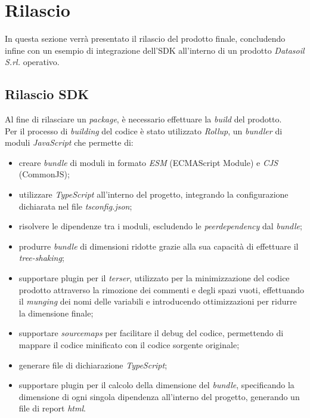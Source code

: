 \chapter{Rilascio}
\label{chap:rilascio}
In questa sezione verrà presentato il rilascio del prodotto finale, concludendo infine con un esempio di integrazione dell'SDK
all'interno di un prodotto \textit{Datasoil S.rl.} operativo.

\section{Rilascio SDK}
Al fine di rilasciare un \textit{package}, è necessario effettuare la \textit{build} del prodotto. \\
Per il processo di \textit{building} del codice è stato utilizzato \textit{Rollup}, un \textit{bundler} di moduli \textit{JavaScript} che permette di:
\begin{itemize}
    \item creare \textit{bundle} di moduli in formato \textit{ESM} (ECMAScript Module) e \textit{CJS} (CommonJS);
    \item utilizzare \textit{TypeScript} all'interno del progetto, integrando la configurazione dichiarata nel file \textit{tsconfig.json};
    \item risolvere le dipendenze tra i moduli, escludendo le \textit{peerdependency} dal \textit{bundle};
    \item produrre \textit{bundle} di dimensioni ridotte grazie alla sua capacità di effettuare il \textit{tree-shaking};
    \item supportare plugin per il \textit{terser}, utilizzato per la minimizzazione del codice prodotto attraverso la rimozione dei commenti e degli spazi vuoti,
          effettuando il \textit{\gls{munging}} dei nomi delle variabili e introducendo ottimizzazioni per ridurre la dimensione finale;
    \item supportare \textit{sourcemaps} per facilitare il debug del codice, permettendo di mappare il codice minificato con il codice sorgente originale;
    \item generare file di dichiarazione \textit{TypeScript};
    \item supportare plugin per il calcolo della dimensione del \textit{bundle}, specificando la dimensione di ogni singola dipendenza
          all'interno del progetto, generando un file di report \textit{html}.
\end{itemize}

